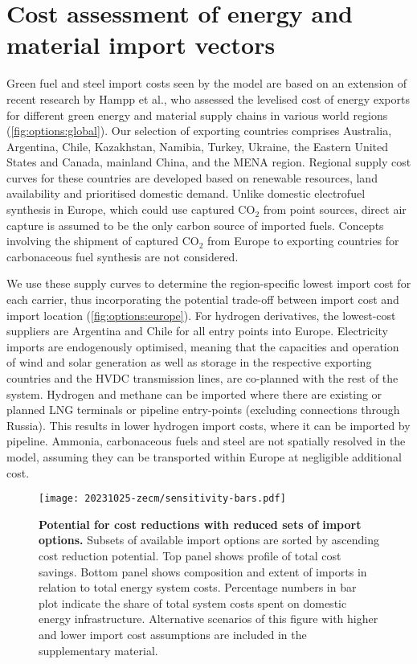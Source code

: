 
\section*{Cost assessment of energy and material import vectors}


Green fuel and steel import costs seen by the model are based on an extension of
recent research by Hampp et al.,\cite{hamppImportOptions2023} who assessed the
levelised cost of energy exports for different green energy and material supply
chains in various world regions (\cref{fig:options:global}). Our selection of
exporting countries comprises Australia, Argentina, Chile, Kazakhstan, Namibia,
Turkey, Ukraine, the Eastern United States and Canada, mainland China, and the
MENA region. Regional supply cost curves for these countries are developed based
on renewable resources, land availability and prioritised domestic demand.
Unlike domestic electrofuel synthesis in Europe, which could use captured CO$_2$
from point sources, direct air capture is assumed to be the only carbon source
of imported fuels. Concepts involving the shipment of captured CO$_2$
from Europe to exporting countries for carbonaceous fuel synthesis are not
considered.\cite{treeenergysolutionsGreenCycle2024,fonderSyntheticMethaneClosing2024}


We use these supply curves to determine the region-specific lowest import cost
for each carrier, thus incorporating the potential trade-off between import cost
and import location (\cref{fig:options:europe}). For hydrogen derivatives, the
lowest-cost suppliers are Argentina and Chile for all entry points into Europe.
Electricity imports are endogenously optimised, meaning that the capacities and
operation of wind and solar generation as well as storage in the respective
exporting countries and the HVDC transmission lines, are co-planned with the
rest of the system. Hydrogen and methane can be imported where there are
existing or planned LNG terminals or pipeline entry-points (excluding
connections through Russia). This results in lower hydrogen import costs, where
it can be imported by pipeline. Ammonia, carbonaceous fuels and steel are not
spatially resolved in the model, assuming they can be transported within Europe
at negligible additional cost.

\begin{figure*}
    \texttt{[image: 20231025-zecm/sensitivity-bars.pdf]}
    \caption{\textbf{Potential for cost reductions with reduced sets of import options.}
        Subsets of available import options are sorted by ascending cost
        reduction potential. Top panel shows profile of total cost savings.
        Bottom panel shows composition and extent of imports in relation to
        total energy system costs. Percentage numbers in bar plot indicate the
        share of total system costs spent on domestic energy infrastructure.
        Alternative scenarios of this figure with higher and lower import cost
        assumptions are included in the supplementary material. }
    \label{fig:sensitivity-bars}
\end{figure*}

